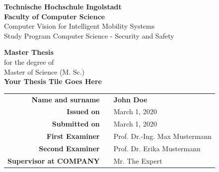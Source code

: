 \begin{titlepage}
	\begin{center}
		\hrulefill 
	\end{center}
	
	
	\begin{center}	
		\vspace{1cm}
		\huge\textbf{Technische Hochschule Ingolstadt}\\[1em]
		\Large \textbf{Faculty of Computer Science}\\ 
		\normalsize
		Computer Vision for Intelligent Mobility Systems \\ 
		Study Program Computer Science - Security and Safety \\ [2.5em]
	\end{center}


	\begin{center}	
		\vspace{1cm}
		\Large \textbf{Master Thesis}\\ 
		\normalsize
		for the degree of \\ 
		Master of Science (M. Sc.) \\ [3.5em]
		\huge\textbf{Your Thesis Tile Goes Here}	 \\ [3.5em]
	\end{center}



	
	\begin{center}
		\vspace{1cm}
		\hspace{1cm}
		\begin{tabular}{r@{:}ll}
			\textbf{Name and surname} & & \textbf{John Doe}	\\ [3em]
			
			\textbf{Issued on}	& & March 1, 2020	\\ [1em] %
			\textbf{Submitted on}	& & March 1, 2020	\\ [3em] %
			
			\textbf{First Examiner} &	& Prof. Dr.-Ing. Max Mustermann	\\ [1em]
			\textbf{Second Examiner} 	& & Prof. Dr. Erika Mustermann	\\[3em]
			
			\textbf{Supervisor at COMPANY} &	& Mr. The Expert \\ %
		\end{tabular}
	\end{center}
	
\end{titlepage}

\restoregeometry